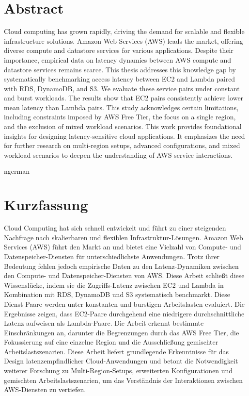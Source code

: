 \documentclass[a4paper, 11pt]{article}
\begin{document}


\newpage

\section*{Abstract}
Cloud computing has grown rapidly, driving the demand for scalable and flexible infrastructure solutions. Amazon Web Services (AWS) leads the market, offering diverse compute and datastore services for various applications. Despite their importance, empirical data on latency dynamics between AWS compute and datastore services remains scarce.
%
This thesis addresses this knowledge gap by systematically benchmarking access latency between EC2 and Lambda paired with RDS, DynamoDB, and S3. We evaluate these service pairs under constant and burst workloads. The results show that EC2 pairs consistently achieve lower mean latency than Lambda pairs.
%
This study acknowledges certain limitations, including constraints imposed by AWS Free Tier, the focus on a single region, and the exclusion of mixed workload scenarios.
%
This work provides foundational insights for designing latency-sensitive cloud applications. It emphasizes the need for further research on multi-region setups, advanced configurations, and mixed workload scenarios to deepen the understanding of AWS service interactions.

\clearpage
\begin{otherlanguage}
    {ngerman}
    \section*{Kurzfassung}
    Cloud Computing hat sich schnell entwickelt und führt zu einer steigenden Nachfrage nach skalierbaren und flexiblen Infrastruktur-Lösungen. Amazon Web Services (AWS) führt den Markt an und bietet eine Vielzahl von Compute- und Datenspeicher-Diensten für unterschiedlichste Anwendungen. Trotz ihrer Bedeutung fehlen jedoch empirische Daten zu den Latenz-Dynamiken zwischen den Compute- und Datenspeicher-Diensten von AWS.
    Diese Arbeit schließt diese Wissenslücke, indem sie die Zugriffs-Latenz zwischen EC2 und Lambda in Kombination mit RDS, DynamoDB und S3 systematisch benchmarkt. Diese Dienst-Paare werden unter konstanten und burstigen Arbeitslasten evaluiert. Die Ergebnisse zeigen, dass EC2-Paare durchgehend eine niedrigere durchschnittliche Latenz aufweisen als Lambda-Paare.
    Die Arbeit erkennt bestimmte Einschränkungen an, darunter die Begrenzungen durch das AWS Free Tier, die Fokussierung auf eine einzelne Region und die Ausschließung gemischter Arbeitslastszenarien.
    Diese Arbeit liefert grundlegende Erkenntnisse für das Design latenzempfindlicher Cloud-Anwendungen und betont die Notwendigkeit weiterer Forschung zu Multi-Region-Setups, erweiterten Konfigurationen und gemischten Arbeitslastszenarien, um das Verständnis der Interaktionen zwischen AWS-Diensten zu vertiefen.
\end{otherlanguage}
\end{document}
